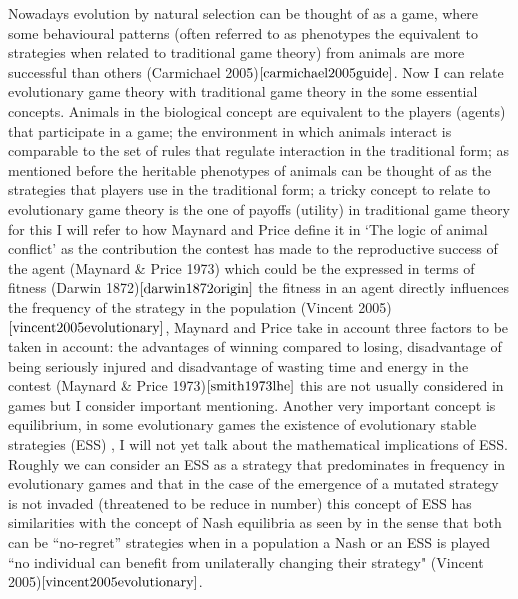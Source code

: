 \documentclass{article}
\begin{document}
Nowadays evolution by natural selection can be thought of as a game, where some behavioural patterns (often referred to as phenotypes the equivalent to strategies when related to traditional game theory) from animals are more successful than others (Carmichael 2005)$\cite{carmichael2005guide}$. Now I can relate evolutionary game theory with traditional game theory in the some essential concepts. Animals in the biological concept are equivalent to the players (agents) that participate in a game; the environment in which animals interact is comparable to the set of rules that regulate interaction in the traditional form; as mentioned before the heritable phenotypes of animals can be thought of as the strategies that players use in the traditional form; a tricky concept to relate to evolutionary game theory is the one of payoffs (utility) in traditional game theory  for this I will refer to how Maynard and Price define it in ‘The logic of animal conflict’ as the contribution the contest has made to the reproductive success of the agent (Maynard \& Price 1973) which could be the expressed in terms of fitness  (Darwin 1872)$\cite{darwin1872origin}$ the fitness in an agent directly influences the frequency of the strategy in the population (Vincent 2005)$\cite{vincent2005evolutionary}$, Maynard and Price take in account three factors to be taken in account: the advantages of winning compared to losing, disadvantage of being seriously injured and disadvantage of wasting time and energy in the contest (Maynard \& Price 1973)$\cite{smith1973lhe}$ this are not usually considered in games but I consider important mentioning. Another very important concept is equilibrium, in some evolutionary games the existence of evolutionary stable strategies (ESS) , I will not yet talk about the mathematical implications of  ESS. Roughly we can consider an ESS as a strategy that predominates in frequency in evolutionary games and that in the case of the emergence of a mutated strategy is not invaded (threatened to be reduce in number) this concept of ESS has similarities with the concept of Nash equilibria as seen by in the sense that both can be ``no-regret'' strategies when in a population a Nash or an ESS is played ``no individual can benefit from unilaterally changing their strategy" (Vincent 2005)$\cite{vincent2005evolutionary}$.  
\end{document}
